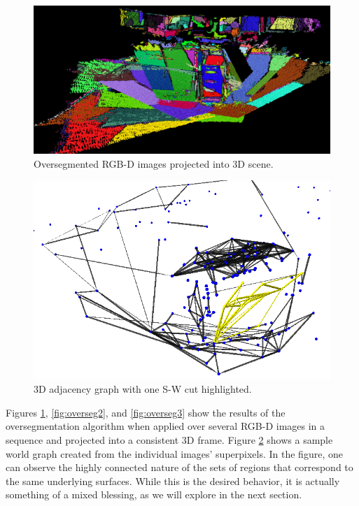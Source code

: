 \documentclass[10pt,letterpaper]{article}
\begin{document}
\begin{figure}[ht]
\begin{center}
	\includegraphics[width=.9\linewidth]{OverSegmented1.png}
\end{center}
\caption{Oversegmented RGB-D images projected into 3D scene.}
\label{fig:overseg1}
\end{figure}

\begin{figure}[ht]
\begin{center}
	\includegraphics[width=.9\linewidth]{graph1.png}
\end{center}
\caption{3D adjacency graph with one S-W cut highlighted.}
\label{fig:highGraph}
\end{figure}

	Figures \ref{fig:overseg1}, \ref{fig:overseg2}, and \ref{fig:overseg3} show the results of the oversegmentation algorithm when applied over several RGB-D images in a sequence and projected into a consistent 3D frame. Figure \ref{fig:highGraph} shows a sample world graph created from the individual images' superpixels. In the figure, one can observe the highly connected nature of the sets of regions that correspond to the same underlying surfaces. While this is the desired behavior, it is actually something of a mixed blessing, as we will explore in the next section.
\end{document}
